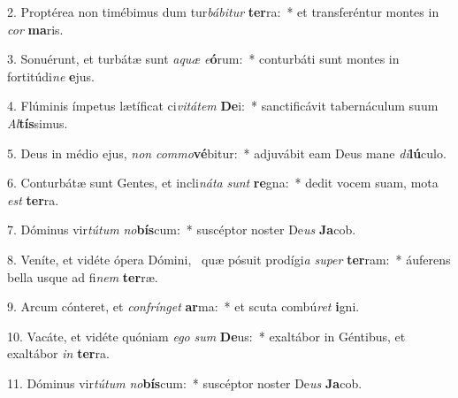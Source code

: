 2. Proptérea non timébimus dum tur\textit{bá}\textit{bi}\textit{tur} \textbf{ter}ra:~*  et transferéntur montes in \textit{cor} \textbf{ma}ris.\

3. Sonuérunt, et turbátæ sunt \textit{a}\textit{quæ} \textit{e}\textbf{ó}rum:~*  conturbáti sunt montes in fortitúdi\textit{ne} \textbf{e}jus.\

4. Flúminis ímpetus lætíficat ci\textit{vi}\textit{tá}\textit{tem} \textbf{De}i:~*  sanctificávit tabernáculum suum \textit{Al}\textbf{tís}simus.\

5. Deus in médio ejus, \textit{non} \textit{com}\textit{mo}\textbf{vé}bitur:~*  adjuvábit eam Deus mane \textit{di}\textbf{lú}culo.\

6. Conturbátæ sunt Gentes, et incli\textit{ná}\textit{ta} \textit{sunt} \textbf{re}gna:~*  dedit vocem suam, mota \textit{est} \textbf{ter}ra.\

7. Dóminus vir\textit{tú}\textit{tum} \textit{no}\textbf{bís}cum:~*  suscéptor noster De\textit{us} \textbf{Ja}cob.\

8. Veníte, et vidéte ópera Dómini, \dag\  quæ pósuit prodígi\textit{a} \textit{su}\textit{per} \textbf{ter}ram:~*  áuferens bella usque ad fi\textit{nem} \textbf{ter}ræ.\

9. Arcum cónteret, et \textit{con}\textit{frín}\textit{get} \textbf{ar}ma:~*  et scuta combú\textit{ret} \textbf{i}gni.\

10. Vacáte, et vidéte quóniam \textit{e}\textit{go} \textit{sum} \textbf{De}us:~*  exaltábor in Géntibus, et exaltábor \textit{in} \textbf{ter}ra.\

11. Dóminus vir\textit{tú}\textit{tum} \textit{no}\textbf{bís}cum:~*  suscéptor noster De\textit{us} \textbf{Ja}cob.\

